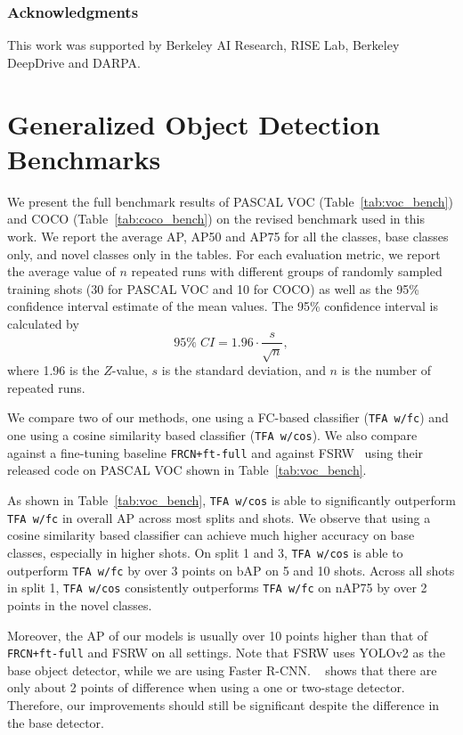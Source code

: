\documentclass{article}
\newcommand{\model}{TFA\xspace}
\begin{document}
 

\subsubsection*{Acknowledgments}
This work was supported by Berkeley AI Research, RISE Lab, Berkeley DeepDrive and DARPA. 






\appendix
\section{Generalized Object Detection Benchmarks}
We present the full benchmark results of PASCAL VOC (Table~\ref{tab:voc_bench}) and COCO
(Table~\ref{tab:coco_bench}) on the revised benchmark used in this work. We report the average AP, AP50 and AP75 for all the classes, base classes only, and novel classes only in the tables. For each evaluation metric, we report the average value of $n$ repeated runs with different groups of randomly sampled training shots (30 for PASCAL VOC and 10 for COCO) as well as the 95\% confidence interval estimate of the mean values.  The 95\% confidence interval is calculated by 
\begin{equation}
    95\% \; CI = 1.96 \cdot \frac{s}{\sqrt{n}},
\end{equation}
where 1.96 is the $Z$-value, $s$ is the standard deviation, and $n$ is the number of repeated runs.

We compare two of our methods, one using a FC-based classifier (\texttt{\model w/fc}) and one using a cosine similarity based classifier (\texttt{\model w/cos}). We also compare against a fine-tuning baseline \texttt{FRCN+ft-full} and against FSRW~\cite{kang2019few} using their released code on PASCAL VOC shown in Table~\ref{tab:voc_bench}. 

As shown in Table~\ref{tab:voc_bench},
\texttt{\model w/cos} is able to significantly outperform \texttt{\model w/fc} in overall AP across most splits and shots.
We observe that using a cosine similarity based classifier can achieve much higher accuracy on base classes, especially in higher shots.
On split 1 and 3, \texttt{\model w/cos} is able to outperform \texttt{\model w/fc} by over 3 points on bAP on 5 and 10 shots.
Across all shots in split 1, \texttt{\model w/cos} consistently outperforms \texttt{\model w/fc} on nAP75 by over 2 points in the novel classes. 

Moreover, the AP of our models is usually over 10 points higher than that of \texttt{FRCN+ft-full} and FSRW on all settings. Note that FSRW uses YOLOv2 as the base object detector, while we are using Faster R-CNN. ~\citet{wang2019meta} shows that there are only about 2 points of difference when using a one or two-stage detector. Therefore, our improvements should still be significant despite the difference in the base detector.
\end{document}
